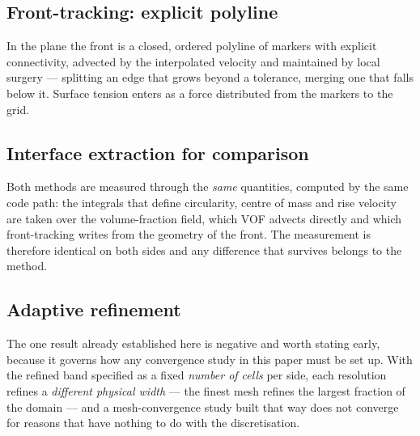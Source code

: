 
\subsection{Front-tracking: explicit polyline}

In the plane the front is a closed, ordered polyline of markers with explicit
connectivity, advected by the interpolated velocity and maintained by local
surgery --- splitting an edge that grows beyond a tolerance, merging one that
falls below it. Surface tension enters as a force distributed from the markers
to the grid.


\subsection{Interface extraction for comparison}

Both methods are measured through the \emph{same} quantities, computed by the
same code path: the integrals that define circularity, centre of mass and rise
velocity are taken over the volume-fraction field, which VOF advects directly
and which front-tracking writes from the geometry of the front. The measurement
is therefore identical on both sides and any difference that survives belongs
to the method.

\subsection{Adaptive refinement}


The one result already established here is negative and worth stating early,
because it governs how any convergence study in this paper must be set up. With
the refined band specified as a fixed \emph{number of cells} per side, each
resolution refines a \emph{different physical width} --- the finest mesh
refines the largest fraction of the domain --- and a mesh-convergence study
built that way does not converge for reasons that have nothing to do with the
discretisation.

